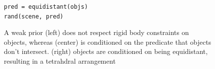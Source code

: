 \begin{figure}[h]
\begin{minipage}[t]{5cm}
\begin{verbatim}
pred = equidistant(objs)
rand(scene, pred)
\end{verbatim}
\end{minipage}
\caption{A weak prior (left) does not respect rigid body constraints on objects, whereas (center) is conditioned on the predicate that objects don't intersect.  (right) objects are conditioned on being equidistant, resulting in a tetrahdral arrangement}
\label{fig:nointersect}
\end{figure}



